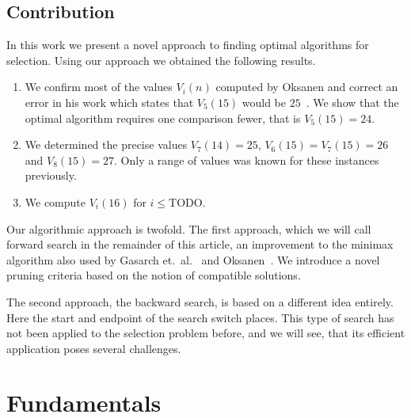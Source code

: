 \documentclass[twoside,leqno,twocolumn]{article}
\begin{document}
\subsection{Contribution}
In this work we present a novel approach to finding optimal algorithms for selection.
Using our approach we obtained the following results.
\begin{enumerate}
  \item We confirm most of the values $V_i(n)$ computed by Oksanen and correct an error in his work which states that $V_5(15)$ would be $25$~\cite{Oksanen}.
        We show that the optimal algorithm requires one comparison fewer, that is $V_5(15) = 24$.
  \item We determined the precise values $V_7(14) = 25$, $V_6(15) = V_7(15) = 26$ and $V_8(15) = 27$.
        Only a range of values was known for these instances previously.
  \item We compute $V_i(16)$ for $i \le \text{TODO}$.
\end{enumerate}

Our algorithmic approach is twofold.
The first approach, which we will call forward search in the remainder of this article, an improvement to the minimax algorithm also used by Gasarch et.\ al\@.~\cite{Gasarch1996} and Oksanen~\cite{Oksanen,Oksanen2006}.
We introduce a novel pruning criteria based on the notion of compatible solutions.

The second approach, the backward search, is based on a different idea entirely.
Here the start and endpoint of the search switch places.
This type of search has not been applied to the selection problem before, and we will see, that its efficient application poses several challenges.

\section{Fundamentals}
\end{document}
